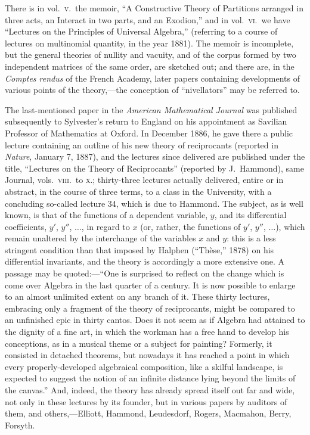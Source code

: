 \documentclass[11pt,a4paper]{article}
\begin{document}
There is in vol.\ \textsc{v}.\ the memoir, ``A Constructive Theory of Partitions arranged in three acts, an Interact in two parts, and an Exodion,'' and in vol.\ \textsc{vi}.\ we have ``Lectures on the Principles of Universal Algebra,'' (referring to a course of lectures on multinomial quantity, in the year 1881). The memoir is incomplete, but the general theories of nullity and vacuity, and of the corpus formed by two independent matrices of the same order, are sketched out; and there are, in the \emph{Comptes rendus} of the French Academy, later papers containing developments of various points of the theory,---the conception of ``nivellators'' may be referred to.

The last-mentioned paper in the \emph{American Mathematical Journal} was published subsequently to Sylvester's return to England on his appointment as Savilian Professor of Mathematics at Oxford. In December 1886, he gave there a public lecture containing an outline of his new theory of reciprocants (reported in \emph{Nature}, January 7, 1887), and the lectures since delivered are published under the title, ``Lectures on the Theory of Reciprocants'' (reported by J.\ Hammond), same Journal, vols.\ \textsc{viii}.\ to \textsc{x}.; thirty-three lectures actually delivered, entire or in abstract, in the course of three terms, to a class in the University, with a concluding so-called lecture 34, which is due to Hammond. The subject, as is well known, is that of the functions of a dependent variable, $y$, and its differential coefficients, $y'$, $y''$, $\ldots$, in regard to $x$ (or, rather, the functions of $y'$, $y''$, $\ldots$), which remain unaltered by the interchange of the variables $x$ and $y$: this is a less stringent condition than that imposed by Halphen (``Thèse,'' 1878) on his differential invariants, and the theory is accordingly a more extensive one. A passage may be quoted:---``One is surprised to reflect on the change which is come over Algebra in the last quarter of a century. It is now possible to enlarge to an almost unlimited extent on any branch of it. These thirty lectures, embracing only a fragment of the theory of reciprocants, might be compared to an unfinished epic in thirty cantos. Does it not seem as if Algebra had attained to the dignity of a fine art, in which the workman has a free hand to develop his conceptions, as in a musical theme or a subject for painting? Formerly, it consisted in detached theorems, but nowadays it has reached a point in which every properly-developed algebraical composition, like a skilful landscape, is expected to suggest the notion of an infinite distance lying beyond the limits of the canvas.'' And, indeed, the theory has already spread itself out far and wide, not only in these lectures by its founder, but in various papers by auditors of them, and others,---Elliott, Hammond, Leudesdorf, Rogers, Macmahon, Berry, Forsyth.
\end{document}
